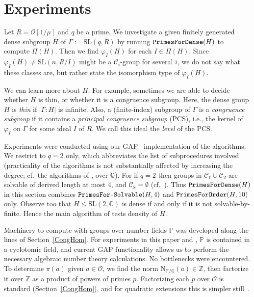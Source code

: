 \documentclass[11pt]{amsart}
\theoremstyle{definition}
\theoremstyle{remark}
\newcommand{\Z}{\mathbb{Z}}
\newcommand{\Q}{\mathbb{Q}}
\renewcommand{\P}{\mathbb{P}}
\newcommand{\C}{\mathbb{C}}
\newcommand{\G}{{\Gamma}}
\newcommand{\SL}{\mathrm{SL}}
\newcommand{\calc}{\mathscr{C}}
\begin{document}
\section{Experiments} 
\label{Exper}

Let $R=\mathcal{O}[1/\mu]$ and $q$ be a prime.
 We investigate a given finitely generated dense subgroup 
$H$ of $\Gamma := \allowbreak \SL(q, R)$ by running 
${\tt PrimesForDense}(H)$ to compute $\Pi(H)$. Then we find 
$\varphi_I(H)$ for each $I \in \Pi(H)$. Since $\varphi_I(H)\neq
\SL(n, R/I)$ might be a $\calc_i$-group for several $i$, we do 
not say what these classes are, but rather state the isomorphism type 
of $\varphi_I(H)$.  

We can learn more about $H$. For example, sometimes we are
able to decide whether  $H$ is thin, or whether it is a congruence 
subgroup. Here, the dense group $H$ is \emph{thin} if $|\G : H|$ 
is infinite. Also, a (finite-index) subgroup of $\G$ is a 
\emph{congruence subgroup} if it contains a 
\emph{principal congruence subgroup} (PCS), i.e., the kernel of 
$\varphi_I$ on $\G$ for some ideal $I$ of $R$. We call  
this ideal the \emph{level} of the PCS.

Experiments were conducted using our {\sf GAP}~\cite{Gap} 
implementation of the algorithms. We restrict to $q=2$
only, which abbreviates the list of subprocedures involved
 (practicality of the algorithms is not substantially 
affected by increasing the degree; cf.~the algorithms of \cite{ExpMath},
 over $\Q$). 
For if $q=2$ then groups in $\calc_1\cup \calc_2$ are 
solvable of derived length at most $4$, and $\calc_8= \allowbreak 
\emptyset$ (cf.~\cite[Remarks~2.8, 3.4]{ExpMath}).
Thus ${\tt PrimesForDense}(H)$ in this section combines 
${\tt PrimesFor}$-${\tt Solvable}(H, 4)$ and ${\tt PrimesForOrder}(H, 10)$
 only. 
Observe too that $H\leq \SL(2, \C)$ is dense if and only if it is 
not solvable-by-finite. Hence the main algorithm of \cite{TitsDFO} tests 
density of $H$. 

Machinery to compute with groups over number fields $\P$ was developed 
along the lines of Section~\ref{CongHom}. For experiments 
in this paper and \cite{SLnO}, 
$\P$ is contained in a cyclotomic field, and current 
{\sf GAP} functionality allows us to perform the necessary algebraic number 
theory calculations. No bottlenecks were encountered.
To determine $\pi(a)$ given $a\in \mathcal{O}$, we find the norm  
$\mathrm{N}_{\P/\mathbb{Q}}(a) \in \allowbreak \Z$, then factorize it over $\Z$ 
as a product of powers of primes $p$. Factorizing each $p$ over 
$\mathcal{O}$ is standard (Section~\ref{CongHom}), and for quadratic 
extensions this is simpler still~\cite[Proposition~3.8.3]{Koch}.
 	
\end{document}
